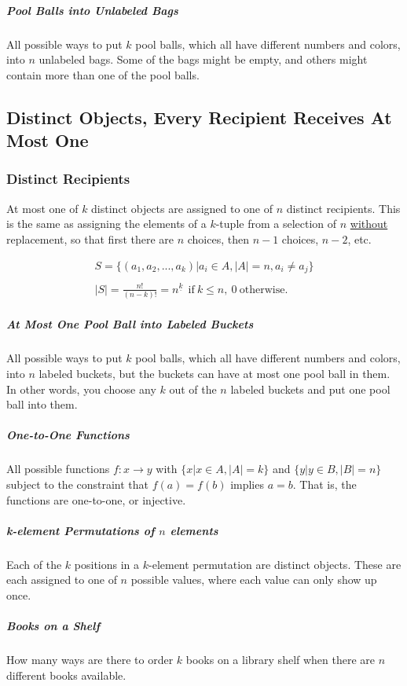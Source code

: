 \subparagraph{Pool Balls into Unlabeled Bags} All possible ways to put $k$ pool balls, which all have different numbers and colors, into $n$ unlabeled bags. Some of the bags might be empty, and others might contain more than one of the pool balls.


\subsection{Distinct Objects, Every Recipient Receives At Most One}

\subsubsection{Distinct Recipients}
At most one of $k$ distinct objects are assigned to one of $n$ distinct recipients. This is the same as assigning the elements of a $k$-tuple from a selection of $n$ \underline{without} replacement, so that first there are $n$ choices, then $n-1$ choices, $n-2$, etc.

\begin{equation}	
\begin{array}{l}
S = \{ (a_1,a_2,...,a_k) | a_i \in A, |A| = n, a_i\neq a_j\}\\
\\
|S| = \frac{n!}{(n-k)!} = n^{\underline{k}}\ \ \mathrm{if\ }k\leq n,\ 0\ \mathrm{otherwise.}
\end{array}
\end{equation}

\subparagraph{At Most One Pool Ball into Labeled Buckets} All possible ways to put $k$ pool balls, which all have different numbers and colors, into $n$ labeled buckets, but the buckets can have at most one pool ball in them. In other words, you choose any $k$ out of the $n$ labeled buckets and put one pool ball into them. 

\subparagraph{One-to-One Functions} All possible functions $f:x \rightarrow y$ with $\{x | x\in A, |A| = k \}$ and $\{y | y\in B, |B| = n\}$ subject to the constraint that $f(a) = f(b)$ implies $a=b$. That is, the functions are one-to-one, or injective.

\subparagraph{k-element Permutations of $n$ elements}  Each of the $k$ positions in a $k$-element permutation are distinct objects. These are each assigned to one of $n$ possible values, where each value can only show up once. 

\subparagraph{Books on a Shelf} How many ways are there to order $k$ books on a library shelf when there are $n$ different books available. 


